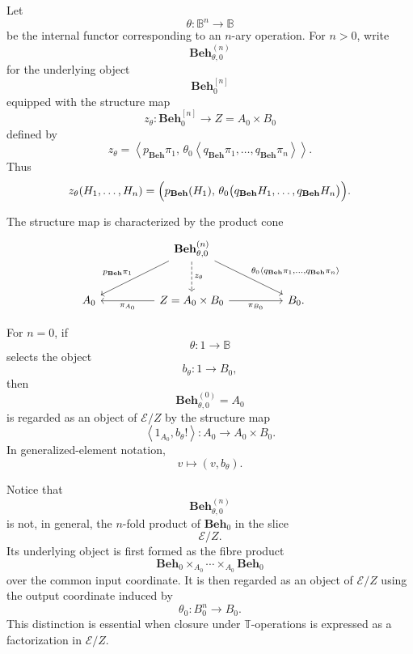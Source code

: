 Let
\[
    \theta:\mathbb B^n\to\mathbb B
\]
be the internal functor corresponding to an \(n\)-ary operation. For \(n>0\),
write
\[
    \mathbf{Beh}^{(n)}_{\theta,0}
\]
for the underlying object
\[
    \mathbf{Beh}_0^{[n]}
\]
equipped with the structure map
\[
    z_\theta:
    \mathbf{Beh}_0^{[n]}
    \to
    Z=A_0\times B_0
\]
defined by
\[
    z_\theta
    =
    \left\langle
        p_{\mathbf{Beh}}\pi_1,\,
        \theta_0
        \left\langle
            q_{\mathbf{Beh}}\pi_1,
            \dots,
            q_{\mathbf{Beh}}\pi_n
        \right\rangle
    \right\rangle.
\]
Thus
\[
    z_\theta(H_1,\dots,H_n)
    =
    \Bigl(
        p_{\mathbf{Beh}}(H_1),\,
        \theta_0
        \bigl(
            q_{\mathbf{Beh}}H_1,
            \dots,
            q_{\mathbf{Beh}}H_n
        \bigr)
    \Bigr).
\]

The structure map is characterized by the product cone
\[
\begin{tikzcd}[column sep=huge, row sep=large]
    &
    \mathbf{Beh}^{(n)}_{\theta,0}
        \arrow[dl, "{p_{\mathbf{Beh}}\pi_1}"']
        \arrow[d, dashed, "z_\theta"]
        \arrow[dr,
            "{\theta_0
            \langle
                q_{\mathbf{Beh}}\pi_1,
                \dots,
                q_{\mathbf{Beh}}\pi_n
            \rangle}"]
    &
    \\
    A_0
    &
    Z=A_0\times B_0
        \arrow[l, "\pi_{A_0}"]
        \arrow[r, "\pi_{B_0}"']
    &
    B_0 .
\end{tikzcd}
\]

For \(n=0\), if
\[
    \theta:1\to\mathbb B
\]
selects the object
\[
    b_\theta:1\to B_0,
\]
then
\[
    \mathbf{Beh}^{(0)}_{\theta,0}=A_0
\]
is regarded as an object of \(\mathcal E/Z\) by the structure map
\[
    \left\langle
        1_{A_0},
        b_\theta!
    \right\rangle:
    A_0\to A_0\times B_0.
\]
In generalized-element notation,
\[
    v\longmapsto(v,b_\theta).
\]

Notice that
\[
    \mathbf{Beh}^{(n)}_{\theta,0}
\]
is not, in general, the \(n\)-fold product of \(\mathbf{Beh}_0\) in the slice
\[
    \mathcal E/Z.
\]
Its underlying object is first formed as the fibre product
\[
    \mathbf{Beh}_0
    \times_{A_0}
    \cdots
    \times_{A_0}
    \mathbf{Beh}_0
\]
over the common input coordinate. It is then regarded as an object of
\(\mathcal E/Z\) using the output coordinate induced by
\[
    \theta_0:B_0^n\to B_0.
\]
This distinction is essential when closure under \(\mathbb T\)-operations is
expressed as a factorization in \(\mathcal E/Z\).

